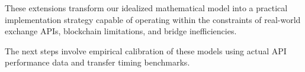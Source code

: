 \documentclass{article}
\begin{document}
These extensions transform our idealized mathematical model into a practical implementation strategy capable of operating within the constraints of real-world exchange APIs, blockchain limitations, and bridge inefficiencies.

The next steps involve empirical calibration of these models using actual API performance data and transfer timing benchmarks.
\end{document}
